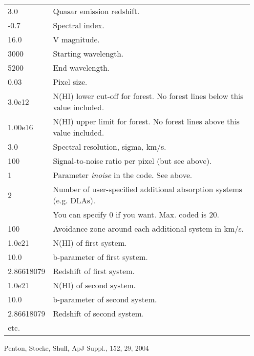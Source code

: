 \documentclass[a4paper,12pt]{article}
\begin{document}
\begin{tabular}{ l l }
3.0 & Quasar emission redshift.\\
-0.7 & Spectral index.\\
16.0 & V magnitude.\\
3000 & Starting wavelength.\\
5200 & End wavelength.\\
0.03 & Pixel size.\\
3.0e12 & N(HI) lower cut-off for forest.  No forest lines below this value included.\\
1.00e16 & N(HI) upper limit for forest.  No forest lines above this value included.\\
3.0 & Spectral resolution, sigma, km/s.\\
100 & Signal-to-noise ratio per pixel (but see above).\\
1 & Parameter {\it inoise} in the code.  See above.\\
2 & Number of user-specified additional absorption systems (e.g. DLAs).\\
  & You can specify 0 if you want.  Max. coded is 20.\\
100 & Avoidance zone around each additional system in km/s.\\
1.0e21 & N(HI) of first system.\\
10.0 & b-parameter of first system.\\
2.86618079 & Redshift of first system.\\
1.0e21 & N(HI) of second system.\\
10.0 & b-parameter of second system.\\
2.86618079 & Redshift of second system.\\
etc. &\\
\end{tabular}

\begin{thebibliography}{99}

 Penton, Stocke, Shull, ApJ Suppl., 152, 29, 2004

\end{thebibliography}
\end{document}
